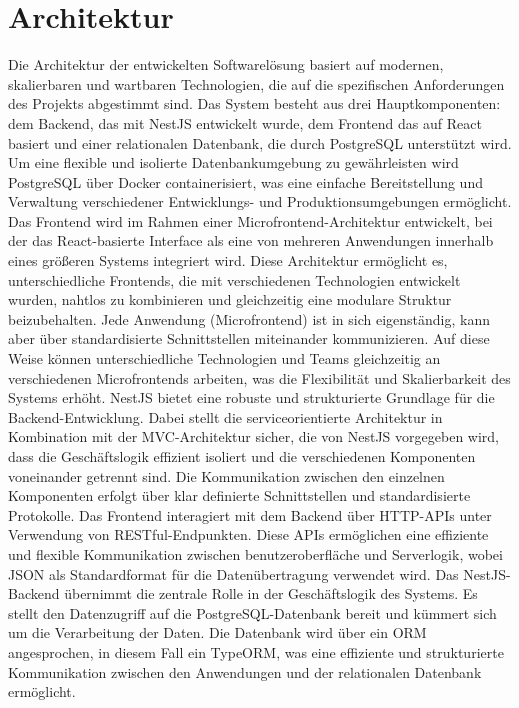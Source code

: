 \section{Architektur}
Die Architektur der entwickelten Softwarelösung basiert auf modernen, skalierbaren und wartbaren Technologien, die auf die spezifischen Anforderungen des Projekts abgestimmt sind. Das System besteht aus drei Hauptkomponenten: dem Backend, das mit NestJS entwickelt wurde, dem Frontend das auf React basiert und einer relationalen Datenbank, die durch PostgreSQL unterstützt wird. Um eine flexible und isolierte Datenbankumgebung zu gewährleisten wird PostgreSQL über Docker containerisiert, was eine einfache Bereitstellung und Verwaltung verschiedener Entwicklungs- und Produktionsumgebungen ermöglicht.
\newline
\newline
Das Frontend wird im Rahmen einer Microfrontend-Architektur entwickelt, bei der das React-basierte Interface als eine von mehreren Anwendungen innerhalb eines größeren Systems integriert wird. Diese Architektur ermöglicht es, unterschiedliche Frontends, die mit verschiedenen Technologien entwickelt wurden, nahtlos zu kombinieren und gleichzeitig eine modulare Struktur beizubehalten. Jede Anwendung (Microfrontend) ist in sich eigenständig, kann aber über standardisierte Schnittstellen miteinander kommunizieren. Auf diese Weise können unterschiedliche Technologien und Teams gleichzeitig an verschiedenen Microfrontends arbeiten, was die Flexibilität und Skalierbarkeit des Systems erhöht.
\newline
\newline
NestJS bietet eine robuste und strukturierte Grundlage für die Backend-Entwicklung. Dabei stellt die serviceorientierte Architektur in Kombination mit der \ac{MVC}-Architektur sicher, die von NestJS vorgegeben wird, dass die Geschäftslogik effizient isoliert und die verschiedenen Komponenten voneinander getrennt sind.
\newline
Die Kommunikation zwischen den einzelnen Komponenten erfolgt über klar definierte Schnittstellen und standardisierte Protokolle. Das Frontend interagiert mit dem Backend über HTTP-APIs unter Verwendung von RESTful-Endpunkten. Diese APIs ermöglichen eine effiziente und flexible Kommunikation zwischen benutzeroberfläche und Serverlogik, wobei JSON als Standardformat für die Datenübertragung verwendet wird.
\newline
Das NestJS-Backend übernimmt die zentrale Rolle in der Geschäftslogik des Systems. Es stellt den Datenzugriff auf die PostgreSQL-Datenbank bereit und kümmert sich um die Verarbeitung der Daten. Die Datenbank wird über ein \ac{ORM} angesprochen, in diesem Fall ein TypeORM, was eine effiziente und strukturierte Kommunikation zwischen den Anwendungen und der relationalen Datenbank ermöglicht.
